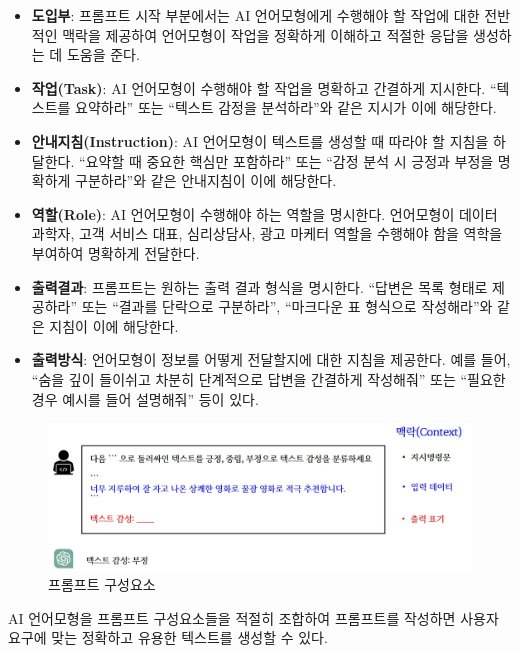 \documentclass[
  letterpaper,
]{book}
\begin{document}
\begin{itemize}
\item
  \textbf{도입부}: 프롬프트 시작 부분에서는 AI 언어모형에게 수행해야 할
  작업에 대한 전반적인 맥락을 제공하여 언어모형이 작업을 정확하게
  이해하고 적절한 응답을 생성하는 데 도움을 준다.
\item
  \textbf{작업(Task)}: AI 언어모형이 수행해야 할 작업을 명확하고
  간결하게 지시한다. ``텍스트를 요약하라'' 또는 ``텍스트 감정을
  분석하라''와 같은 지시가 이에 해당한다.
\item
  \textbf{안내지침(Instruction)}: AI 언어모형이 텍스트를 생성할 때
  따라야 할 지침을 하달한다. ``요약할 때 중요한 핵심만 포함하라'' 또는
  ``감정 분석 시 긍정과 부정을 명확하게 구분하라''와 같은 안내지침이
  이에 해당한다.
\item
  \textbf{역할(Role)}: AI 언어모형이 수행해야 하는 역할을 명시한다.
  언어모형이 데이터 과학자, 고객 서비스 대표, 심리상담사, 광고 마케터
  역할을 수행해야 함을 역학을 부여하여 명확하게 전달한다.
\item
  \textbf{출력결과}: 프롬프트는 원하는 출력 결과 형식을 명시한다.
  ``답변은 목록 형태로 제공하라'' 또는 ``결과를 단락으로 구분하라'',
  ``마크다운 표 형식으로 작성해라''와 같은 지침이 이에 해당한다.
\item
  \textbf{출력방식}: 언어모형이 정보를 어떻게 전달할지에 대한 지침을
  제공한다. 예를 들어, ``숨을 깊이 들이쉬고 차분히 단계적으로 답변을
  간결하게 작성해줘'' 또는 ``필요한 경우 예시를 들어 설명해줘'' 등이
  있다.
\end{itemize}

\begin{figure}

{\centering \includegraphics[width=13.45833in,height=\textheight]{images/prompt_anatomy.jpg}

}

\caption{프롬프트 구성요소}

\end{figure}

AI 언어모형을 프롬프트 구성요소들을 적절히 조합하여 프롬프트를 작성하면
사용자 요구에 맞는 정확하고 유용한 텍스트를 생성할 수 있다.
\end{document}
